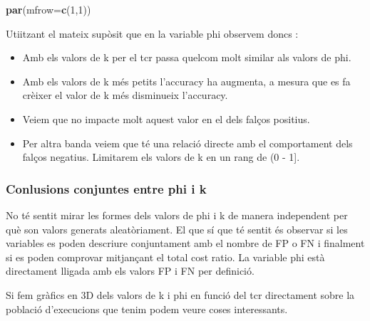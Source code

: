 \documentclass[]{article}
\newenvironment{Shaded}{\begin{snugshade}}{\end{snugshade}}
\newcommand{\DataTypeTok}[1]{\textcolor[rgb]{0.13,0.29,0.53}{#1}}
\newcommand{\DecValTok}[1]{\textcolor[rgb]{0.00,0.00,0.81}{#1}}
\newcommand{\KeywordTok}[1]{\textcolor[rgb]{0.13,0.29,0.53}{\textbf{#1}}}
\newcommand{\NormalTok}[1]{#1}
\providecommand{\tightlist}{%
  \setlength{\itemsep}{0pt}\setlength{\parskip}{0pt}}
\begin{document}
\begin{Shaded}
\begin{Highlighting}[]
\KeywordTok{par}\NormalTok{(}\DataTypeTok{mfrow=}\KeywordTok{c}\NormalTok{(}\DecValTok{1}\NormalTok{,}\DecValTok{1}\NormalTok{))}
\end{Highlighting}
\end{Shaded}

Utiitzant el mateix supòsit que en la variable phi observem doncs :

\begin{itemize}
\tightlist
\item
  Amb els valors de k per el tcr passa quelcom molt similar als valors
  de phi.
\item
  Amb els valors de k més petits l'accuracy ha augmenta, a mesura que es
  fa crèixer el valor de k més disminueix l'accuracy.
\item
  Veiem que no impacte molt aquest valor en el dels falços positius.
\item
  Per altra banda veiem que té una relació directe amb el comportament
  dels falços negatius. Limitarem els valors de k en un rang de (0 -
  1{]}.
\end{itemize}

\hypertarget{conlusions-conjuntes-entre-phi-i-k}{%
\subsubsection{Conlusions conjuntes entre phi i
k}\label{conlusions-conjuntes-entre-phi-i-k}}

No té sentit mirar les formes dels valors de phi i k de manera
independent per què son valors generats aleatòriament. El que sí que té
sentit és observar si les variables es poden descriure conjuntament amb
el nombre de FP o FN i finalment si es poden comprovar mitjançant el
total cost ratio. La variable phi està directament lligada amb els
valors FP i FN per definició.

Si fem gràfics en 3D dels valors de k i phi en funció del tcr
directament sobre la població d'execucions que tenim podem veure coses
interessants.
\end{document}
